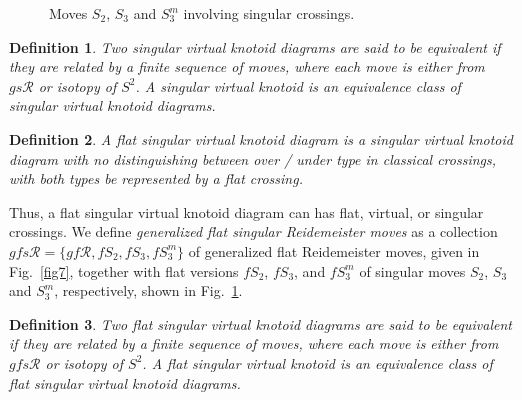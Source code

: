 \documentclass[11pt]{amsart}
\theoremstyle{noparens}
\newtheorem{definition}{Definition}[section]
\numberwithin{equation}{section}
\numberwithin{equation}{section}
\begin{document}
\begin{figure}[htbp]
\begin{center}
\caption{Moves $S_2$, $S_3$ and $S_3^{m}$ involving singular crossings. \label{fig10}}
\end{center}
\end{figure}

\begin{definition} {\rm
Two singular virtual knotoid diagrams are said to be \textit{equivalent} if they are related by a finite sequence of moves, where each move is either from $\textit{gs}\mathcal{R}$ or isotopy of $S^2$. 
A \textit{singular virtual knotoid} is an equivalence class of singular virtual knotoid diagrams.
}
\end{definition}

\begin{definition} {\rm 
A \textit{flat singular virtual knotoid diagram} is a singular virtual knotoid diagram with no distinguishing  between over / under type in classical crossings, with both types be represented by a flat crossing.
}
\end{definition}

Thus, a flat singular virtual knotoid diagram can has flat, virtual, or singular crossings. We define \textit{ generalized flat singular Reidemeister moves} as a collection $\textit{gfs}\mathcal{R} = \{\textit{gf}\mathcal{R}, fS_2, fS_3, fS^m_3\}$ of  generalized flat Reidemeister moves, given in Fig.~\ref{fig7}, together with flat versions $fS_2$, $fS_3$, and $fS_3^{m}$ of singular moves $S_2$, $S_3$ and $S_3^{m}$, respectively, shown in Fig.~\ref{fig10}.

\begin{definition} {\rm
Two flat singular virtual knotoid diagrams are said to be \textit{equivalent} if they are related by a finite sequence of moves, where each move is either from $\textit{gfs}\mathcal{R}$ or isotopy of $S^2$. 
A \textit{flat singular virtual knotoid} is an equivalence class of flat singular virtual knotoid diagrams.
}
\end{definition}
\end{document}
